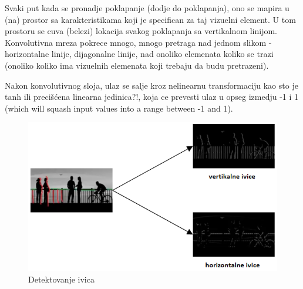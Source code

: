 \documentclass[a4paper]{article}
\begin{document}
Svaki put kada se pronadje poklapanje (dodje do poklapanja), ono se mapira u (na) prostor sa karakteristikama koji je specifican za taj vizuelni element. U tom prostoru se cuva (belezi) lokacija svakog poklapanja sa vertikalnom linijom. Konvolutivna mreza pokrece mnogo, mnogo pretraga nad jednom slikom - horizontalne linije, dijagonalne linije, nad onoliko elemenata koliko se trazi (onoliko koliko ima vizuelnih elemenata koji trebaju da budu pretrazeni).

Nakon konvolutivnog sloja, ulaz se salje kroz nelinearnu transformaciju kao sto je tanh ili precišćena linearna jedinica?!, koja ce prevesti ulaz u opseg izmedju -1 i 1 (which will squash input values into a range between -1 and 1).


\begin{figure}[h!]
\begin{center}
\includegraphics[scale=1]{edges.png}
\end{center}
\caption{Detektovanje ivica}
\label{fig:edges}
\end{figure}
\end{document}
